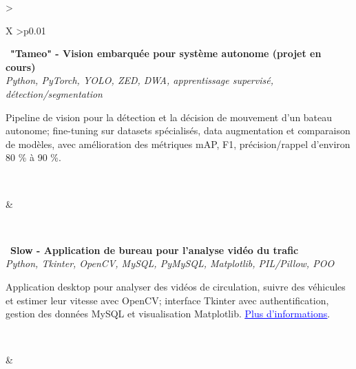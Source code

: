 \documentclass[letterpaper,10pt]{article}
\newcommand{\indentbox}[2][1em]{\hspace*{#1}\parbox{\dimexpr\linewidth-#1\relax}{#2}}
\begin{document}
  \begin{tabularx}{\textwidth}{>{\raggedright\arraybackslash}X >{\raggedleft\arraybackslash}p{0.01\textwidth}}
  
    \begin{minipage}[t]{\linewidth}\raggedright
      \textbullet\ \textbf{"Tameo" - Vision embarquée pour système autonome (projet en cours)}\\
      \textit{\footnotesize Python, PyTorch, YOLO, ZED, DWA, apprentissage supervisé, détection/segmentation}\\
      \indentbox{\footnotesize Pipeline de vision pour la détection et la décision de mouvement d'un bateau autonome; fine-tuning sur datasets spécialisés, data augmentation et comparaison de modèles, avec amélioration des métriques mAP, F1, précision/rappel d'environ 80 \% à 90 \%.}\\
    \end{minipage}
    &
    \begin{minipage}[t]{\linewidth}\raggedleft %
    \end{minipage}\\

    \begin{minipage}[t]{\linewidth}\raggedright
      \textbullet\ \textbf{Slow - Application de bureau pour l'analyse vidéo du trafic}\\
      \textit{\footnotesize Python, Tkinter, OpenCV, MySQL, PyMySQL, Matplotlib, PIL/Pillow, POO}\\
      \indentbox{\footnotesize Application desktop pour analyser des vidéos de circulation, suivre des véhicules et estimer leur vitesse avec OpenCV; interface Tkinter avec authentification, gestion des données MySQL et visualisation Matplotlib. \href{https://github.com/JavierTarazona06/slow}{\textcolor{blue}{\underline{Plus d'informations}}}.}\\
    \end{minipage}
    &
    \begin{minipage}[t]{\linewidth}\raggedleft %
    \end{minipage}\\


\end{tabularx}
\end{document}
